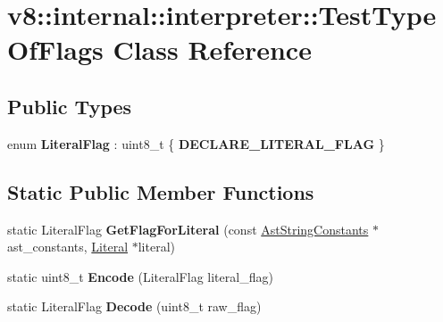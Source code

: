 \hypertarget{classv8_1_1internal_1_1interpreter_1_1TestTypeOfFlags}{}\section{v8\+:\+:internal\+:\+:interpreter\+:\+:Test\+Type\+Of\+Flags Class Reference}
\label{classv8_1_1internal_1_1interpreter_1_1TestTypeOfFlags}
\subsection*{Public Types}
\begin{DoxyCompactItemize}
\item 
\mbox{\label{classv8_1_1internal_1_1interpreter_1_1TestTypeOfFlags_a57166675f00e4eaa2e4df78b5f26259e}} 
enum {\bfseries Literal\+Flag} \+: uint8\+\_\+t \{ {\bfseries D\+E\+C\+L\+A\+R\+E\+\_\+\+L\+I\+T\+E\+R\+A\+L\+\_\+\+F\+L\+AG}
 \}
\end{DoxyCompactItemize}
\subsection*{Static Public Member Functions}
\begin{DoxyCompactItemize}
\item 
\mbox{\label{classv8_1_1internal_1_1interpreter_1_1TestTypeOfFlags_ac1debf14818ac6222fb2f303222d9ef8}} 
static Literal\+Flag {\bfseries Get\+Flag\+For\+Literal} (const \mbox{\hyperlink{classv8_1_1internal_1_1AstStringConstants}{Ast\+String\+Constants}} $\ast$ast\+\_\+constants, \mbox{\hyperlink{classv8_1_1internal_1_1Literal}{Literal}} $\ast$literal)
\item 
\mbox{\label{classv8_1_1internal_1_1interpreter_1_1TestTypeOfFlags_a8d2c4bb6f4f194926dbc9f6264620f85}} 
static uint8\+\_\+t {\bfseries Encode} (Literal\+Flag literal\+\_\+flag)
\item 
\mbox{\label{classv8_1_1internal_1_1interpreter_1_1TestTypeOfFlags_adf1f5b9a9a43a57c1296c416833cc694}} 
static Literal\+Flag {\bfseries Decode} (uint8\+\_\+t raw\+\_\+flag)
\end{DoxyCompactItemize}


